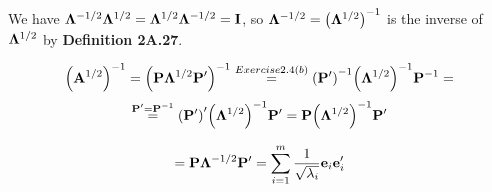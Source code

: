 \begin{enumerate}[font=\bfseries]
\begin{enumerate}
            We have $\bold{\Lambda}^{-1/2}\bold{\Lambda}^{1/2} = \bold{\Lambda}^{1/2}\bold{\Lambda}^{-1/2} = \bold{I}$, so $\bold{\Lambda}^{-1/2} = {\left(\bold{\Lambda}^{1/2}\right)}^{-1}$ is the inverse of $\bold{\Lambda}^{1/2}$ by \textbf{Definition 2A.27}.

            \[
                {\left(\bold{A}^{1/2}\right)}^{-1}
                =
                {\left(\bold{P}\bold{\Lambda}^{1/2}\bold{P}^\prime\right)}^{-1}
                \overset{Exercise 2.4(b)}{=}
                {\left(\bold{P}^\prime\right)}^{-1}{\left(\bold{\Lambda}^{1/2}\right)}^{-1}\bold{P}^{-1} 
                =
            \]
            \[
                \overset{\bold{P}^\prime = \bold{P}^{-1}}{=}
                {\left(\bold{P}^\prime\right)}^\prime{\left(\bold{\Lambda}^{1/2}\right)}^{-1}\bold{P}^\prime
                =
                \bold{P}{\left(\bold{\Lambda}^{1/2}\right)}^{-1}\bold{P}^\prime
            \]

            \[
                =
                \bold{P}\bold{\Lambda}^{-1/2}\bold{P}^\prime
                =
                \sum_{i=1}^m{\frac{1}{\sqrt{\lambda_i}}\bold{e}_i\bold{e}_i^\prime}
            \]


\end{enumerate}
\end{enumerate}
